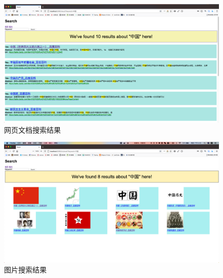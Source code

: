 \documentclass[UTF8]{ctexart}
\begin{document}
        \begin{figure}[ht]
            \centering
            \includegraphics[scale=0.14]{img/doc.png}
            \caption{网页文档搜索结果}
        \end{figure}

        \begin{figure}[ht]
            \centering
            \includegraphics[scale=0.14]{img/img.png}
            \caption{图片搜索结果}
        \end{figure}
\end{document}
